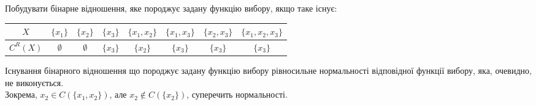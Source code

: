 \begin{problem}
    Побудувати бінарне відношення, яке породжує задану функцію вибору, якщо таке існує:
    \begin{table}[H]
        \centering
        \begin{tabular}{|c|c|c|c|c|c|c|c|}
            \hline
            $X$ & $\{x_1\}$ & $\{x_2\}$ & $\{x_3\}$ & $\{x_1, x_2\}$ & $\{x_1, x_3\}$ & $\{x_2, x_3\}$ & $\{x_1, x_2, x_3\}$ \\ \hline
            $C^R(X)$ & $\emptyset$ & $\emptyset$ & $\{x_3\}$ & $\{x_2\}$ & $\{x_3\}$ & $\{x_3\}$ & $\{x_3\}$ \\ \hline
        \end{tabular}
    \end{table}
\end{problem}

\begin{solution}
    
    Існування бінарного відношення що породжує задану функцію вибору рівносильне нормальності відповідної функції вибору, яка, очевидно, не виконується. \\
        
    Зокрема, $x_2 \in C(\{x_1, x_2\})$, але $x_2 \notin C(\{x_2\})$, суперечить нормальності.
\end{solution}

